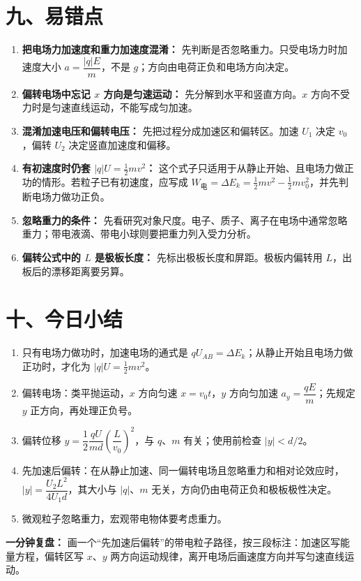 \section*{九、易错点}

\begin{mistakebox}
\begin{enumerate}
  \item \textbf{把电场力加速度和重力加速度混淆：} 先判断是否忽略重力。只受电场力时加速度大小 $a = \dfrac{|q|E}{m}$，不是 $g$；方向由电荷正负和电场方向决定。

  \item \textbf{偏转电场中忘记 $x$ 方向是匀速运动：} 先分解到水平和竖直方向。$x$ 方向不受力时是匀速直线运动，不能写成匀加速。

  \item \textbf{混淆加速电压和偏转电压：} 先把过程分成加速区和偏转区。加速 $U_1$ 决定 $v_0$，偏转 $U_2$ 决定竖直加速度和偏移。

  \item \textbf{有初速度时仍套 $\lvert q\rvert U=\frac12mv^2$：} 这个式子只适用于从静止开始、且电场力做正功的情形。若粒子已有初速度，应写成 $W_{\text{电}}=\Delta E_k=\frac12mv^2-\frac12mv_0^2$，并先判断电场力做功正负。

  \item \textbf{忽略重力的条件：} 先看研究对象尺度。电子、质子、离子在电场中通常忽略重力；带电液滴、带电小球则要把重力列入受力分析。

  \item \textbf{偏转公式中的 $L$ 是极板长度：} 先标出极板长度和屏距。极板内偏转用 $L$，出板后的漂移距离要另算。
\end{enumerate}
\end{mistakebox}

\section*{十、今日小结}

\begin{enumerate}
  \item 只有电场力做功时，加速电场的通式是 $qU_{AB}=\Delta E_k$；从静止开始且电场力做正功时，才化为 $\lvert q\rvert U = \frac12 mv^2$。
  \item 偏转电场：类平抛运动，$x$ 方向匀速 $x = v_0 t$，$y$ 方向匀加速 $a_y = \dfrac{qE}{m}$；先规定 $y$ 正方向，再处理正负号。
  \item 偏转位移 $y = \dfrac12 \dfrac{qU}{md}\left(\dfrac{L}{v_0}\right)^2$，与 $q$、$m$ 有关；使用前检查 $\lvert y\rvert<d/2$。
  \item 先加速后偏转：在从静止加速、同一偏转电场且忽略重力和相对论效应时，
  $|y| = \dfrac{U_2 L^2}{4 U_1 d}$，其大小与 $|q|$、$m$ 无关，方向仍由电荷正负和极板极性决定。
  \item 微观粒子忽略重力，宏观带电物体要考虑重力。
\end{enumerate}

\begin{center}

\end{center}

\textbf{一分钟复盘：} 画一个“先加速后偏转”的带电粒子路径，按三段标注：加速区写能量方程，偏转区写 $x$、$y$ 两方向运动规律，离开电场后画速度方向并写匀速直线运动。
